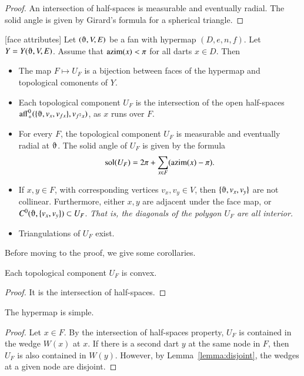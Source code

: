 \begin{proof} An intersection of half-spaces is measurable and
eventually radial.  The solid angle is given by Girard's formula for
a spherical triangle.
\end{proof}

\begin{lemma}[face attributes]\label{lemma:face}
Let $(\orgn,V,E)$ be a fan with hypermap $(D,e,n,f)$. 
Let $Y=Y(\orgn,V,E)$.
Assume that ${\operatorname{azim}}(x)<\pi$
for all darts $x\in D$.  Then
\begin{itemize}
\item The map $F\mapsto U_F$ is a bijection between faces of the hypermap
and topological comonents of $Y$.
\item  Each topological component $U_F$ is the intersection of the open
half-spaces $\op{aff}_+^0(\{\orgn,v_x,v_{f x}\},v_{f^2 x})$, as $x$ runs
over $F$.
\item For every $F$, the topological component $U_F$ is measurable and
eventually radial at $\orgn$.  The solid angle of $U_F$ is given by the
formula
$$
\operatorname{sol}(U_F) = 2\pi + \sum_{x\in F}({\operatorname{azim}}(x)-\pi).
$$
\item If $x,y\in F$, with corresponding vertices $v_x,v_y\in V$, then
$\{\orgn,v_x,v_y\}$ are not collinear.
Furthermore, 
either $x,y$ are adjacent under the face map, or $C^0(\orgn,\{v_x,v_y\})\subset U_F$.  {\it That is, the diagonals of the polygon $U_F$ are all interior.}
\item  Triangulations of $U_F$ exist.
\end{itemize}
\end{lemma}

Before moving to the proof, we give some corollaries.

\begin{corollary}
Each topological component $U_F$ is convex.
\end{corollary}

\begin{proof} It is the intersection of half-spaces.
\end{proof}

\begin{corollary}  
The hypermap is simple.
\end{corollary}

\begin{proof}  Let $x\in F$.  By the intersection of half-spaces property, $U_F$ is contained in the wedge $W(x)$ at $x$.  If there is a second dart $y$ at the same node in $F$, then $U_F$ is also contained in $W(y)$. However, by Lemma~\ref{lemma:disjoint}, the wedges at a given node are disjoint.
\end{proof}

